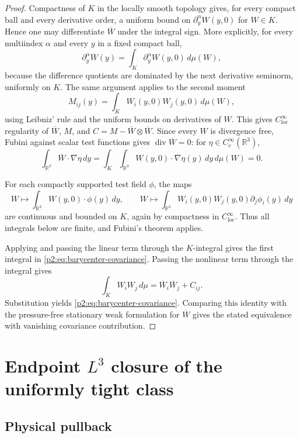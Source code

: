 \documentclass[11pt]{amsart}
\theoremstyle{plain}
\theoremstyle{definition}
\theoremstyle{remark}
\numberwithin{equation}{section}
\newcommand{\R}{\mathbb R}
\newcommand{\loc}{\mathrm{loc}}
\newcommand{\divergence}{\operatorname{div}}
\begin{document}
\begin{proof}
Compactness of \(K\) in the locally smooth topology gives, for every compact
ball and every derivative order, a uniform bound on
\(\partial_y^\alpha W(y,0)\) for \(W\in K\).  Hence one may differentiate
\(\overline W\) under the integral sign.  More explicitly, for every
multiindex \(\alpha\) and every \(y\) in a fixed compact ball,
\[
   \partial_y^\alpha\overline W(y)
   =
   \int_K\partial_y^\alpha W(y,0)\,d\mu(W),
\]
because the difference quotients are dominated by the next derivative
seminorm, uniformly on \(K\).  The same argument applies to the second moment
\[
   M_{ij}(y)=\int_KW_i(y,0)W_j(y,0)\,d\mu(W),
\]
using Leibniz' rule and the uniform bounds on derivatives of \(W\).  This
gives \(C^\infty_{\loc}\) regularity of \(\overline W\), \(M\), and
\(C=M-\overline W\otimes\overline W\).  Since every \(W\) is divergence free,
Fubini against scalar test functions gives \(\divergence\overline W=0\):
for \(\eta\in C_c^\infty(\R^3)\),
\[
   \int_{\R^3}\overline W\cdot\nabla\eta\,dy
   =
   \int_K\int_{\R^3}W(y,0)\cdot\nabla\eta(y)\,dy\,d\mu(W)=0.
\]

For each compactly supported test field \(\phi\), the maps
\[
   W\mapsto\int_{\R^3}W(y,0)\cdot\phi(y)\,dy,
   \qquad
   W\mapsto\int_{\R^3}W_i(y,0)W_j(y,0)\partial_j\phi_i(y)\,dy
\]
are continuous and bounded on \(K\), again by compactness in
\(C^\infty_{\loc}\).  Thus all integrals below are finite, and Fubini's theorem
applies.

Applying  and passing the linear term through
the \(K\)-integral gives the first integral in
\eqref{p2:eq:barycenter-covariance}.  Passing the nonlinear term through the
integral gives
\[
   \int_K W_iW_j\,d\mu
   =
   \overline W_i\overline W_j+C_{ij}.
\]
Substitution yields \eqref{p2:eq:barycenter-covariance}.  Comparing this identity
with the pressure-free stationary weak formulation for \(\overline W\) gives
the stated equivalence with vanishing covariance contribution.
\end{proof}

\section{\texorpdfstring{Endpoint \(L^3\) closure of the uniformly tight class}{Endpoint L3 closure of the uniformly tight class}}
\label{p2:sec:endpoint-L3-closure}

\subsection{Physical pullback}
\end{document}
